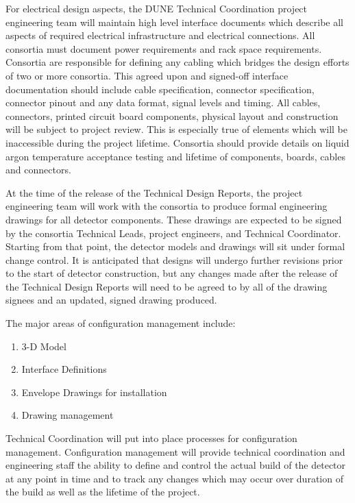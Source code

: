 For electrical design aspects, the DUNE Technical Coordination project
engineering team will maintain high level interface documents which
describe all aspects of required electrical infrastructure and
electrical connections.  All consortia must document power
requirements and rack space requirements.  Consortia are responsible
for defining any cabling which bridges the design efforts of two or
more consortia.  This agreed upon and signed-off interface
documentation should include cable specification, connector
specification, connector pinout and any data format, signal levels and
timing.  All cables, connectors, printed circuit board components,
physical layout and construction will be subject to project review.
This is especially true of elements which will be inaccessible during
the project lifetime.  Consortia should provide details on liquid
argon temperature acceptance testing and lifetime of components,
boards, cables and connectors.


At the time of the release of the Technical Design Reports, the
project engineering team will work with the consortia to produce
formal engineering drawings for all detector components.  These
drawings are expected to be signed by the consortia Technical Leads,
project engineers, and Technical Coordinator.  Starting from that
point, the detector models and drawings will sit under formal change
control.  It is anticipated that designs will undergo further
revisions prior to the start of detector construction, but any changes
made after the release of the Technical Design Reports will need to be
agreed to by all of the drawing signees and an updated, signed drawing
produced.

The major areas of configuration management include:
\begin{enumerate}
  \item 3-D Model
  \item Interface Definitions
  \item Envelope Drawings for installation
  \item Drawing management
\end{enumerate}

\label{ssec:fdsp-coord-integ-cnfg-mgmt}

Technical Coordination will put into place processes for
configuration management.  Configuration management will provide
technical coordination and engineering staff the ability to define and
control the actual build of the detector at any point in time and to
track any changes which may occur over duration of the build as well
as the lifetime of the project.

